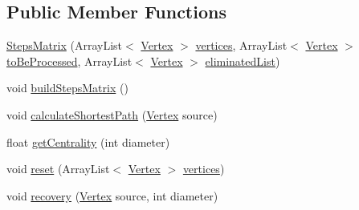 \subsection*{Public Member Functions}
\begin{DoxyCompactItemize}
\item 
\hyperlink{classmain_1_1java_1_1com_1_1company_1_1dijkstratest_1_1_steps_matrix_a656c4786dc8adb10dc37018d8c2c1e66}{Steps\-Matrix} (Array\-List$<$ \hyperlink{classmain_1_1java_1_1com_1_1company_1_1dijkstratest_1_1_vertex}{Vertex} $>$ \hyperlink{classmain_1_1java_1_1com_1_1company_1_1dijkstratest_1_1_steps_matrix_a1a3eb1ca85e39b9b704bfe7e26256afb}{vertices}, Array\-List$<$ \hyperlink{classmain_1_1java_1_1com_1_1company_1_1dijkstratest_1_1_vertex}{Vertex} $>$ \hyperlink{classmain_1_1java_1_1com_1_1company_1_1dijkstratest_1_1_steps_matrix_aa51c97e07faba7d835f614554810ab44}{to\-Be\-Processed}, Array\-List$<$ \hyperlink{classmain_1_1java_1_1com_1_1company_1_1dijkstratest_1_1_vertex}{Vertex} $>$ \hyperlink{classmain_1_1java_1_1com_1_1company_1_1dijkstratest_1_1_steps_matrix_af820b561be0222cbf21fd2a6134047b2}{eliminated\-List})
\item 
void \hyperlink{classmain_1_1java_1_1com_1_1company_1_1dijkstratest_1_1_steps_matrix_a25baaea9cd4f24583b9f81b317b88245}{build\-Steps\-Matrix} ()
\item 
void \hyperlink{classmain_1_1java_1_1com_1_1company_1_1dijkstratest_1_1_steps_matrix_a0d41b80e6dd2a43ac0da575866d00a32}{calculate\-Shortest\-Path} (\hyperlink{classmain_1_1java_1_1com_1_1company_1_1dijkstratest_1_1_vertex}{Vertex} source)
\item 
float \hyperlink{classmain_1_1java_1_1com_1_1company_1_1dijkstratest_1_1_steps_matrix_aa0ceb165ab3fe248dace9dce3c9fd1c6}{get\-Centrality} (int diameter)
\item 
void \hyperlink{classmain_1_1java_1_1com_1_1company_1_1dijkstratest_1_1_steps_matrix_a15b14136df6c93f78deff3e498093c5a}{reset} (Array\-List$<$ \hyperlink{classmain_1_1java_1_1com_1_1company_1_1dijkstratest_1_1_vertex}{Vertex} $>$ \hyperlink{classmain_1_1java_1_1com_1_1company_1_1dijkstratest_1_1_steps_matrix_a1a3eb1ca85e39b9b704bfe7e26256afb}{vertices})
\item 
void \hyperlink{classmain_1_1java_1_1com_1_1company_1_1dijkstratest_1_1_steps_matrix_a78a89eed56a05139649e2a34fd6b4fa7}{recovery} (\hyperlink{classmain_1_1java_1_1com_1_1company_1_1dijkstratest_1_1_vertex}{Vertex} source, int diameter)
\end{DoxyCompactItemize}
